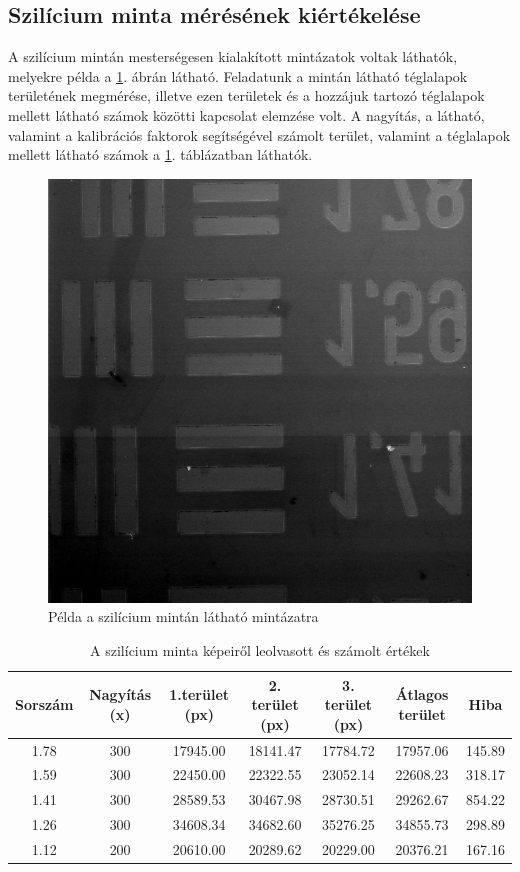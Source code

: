 \documentclass[12pt,a4paper]{article}
\begin{document}
\subsection{Szilícium minta mérésének kiértékelése}
\hspace*{10pt} A szilícium mintán mesterségesen kialakított mintázatok voltak láthatók, melyekre példa a \ref{fig:szil_pel}. ábrán látható. Feladatunk a mintán látható téglalapok területének megmérése, illetve ezen területek és a hozzájuk tartozó téglalapok mellett látható számok közötti kapcsolat elemzése volt. A nagyítás, a látható, valamint a kalibrációs faktorok segítségével számolt terület, valamint a téglalapok mellett látható számok a \ref{tab:szil}. táblázatban láthatók.
\newpage
\begin{figure}[!h]
\centering
\includegraphics[width=0.6\linewidth]{E/E/002_s}
\caption{Példa a szilícium mintán látható mintázatra}
\label{fig:szil_pel}
\end{figure}

\begin{table}[!h]
\begin{center}
\hspace*{-1.5cm}
\begin{tabular}{|c|c|c|c|c|c|c|}
\hline
Sorszám & Nagyítás (x) & 1.terület (px) & 2. terület (px) & 3. terület (px) & Átlagos terület & Hiba\\
\hline
1.78 & 300 & 17945.00 & 18141.47 & 17784.72 &  17957.06 & 145.89\\
\hline
1.59 & 300 & 22450.00 & 22322.55 & 23052.14 & 22608.23 & 318.17\\
\hline
1.41 & 300 & 28589.53 & 30467.98 & 28730.51 & 29262.67 & 854.22\\
\hline
1.26 & 300 & 34608.34 & 34682.60 & 35276.25 & 34855.73 & 298.89\\
\hline
1.12 & 200 & 20610.00 & 20289.62 & 20229.00 & 20376.21 & 167.16\\
\hline
\end{tabular}
\caption{A szilícium minta képeiről leolvasott és számolt értékek}
\label{tab:szil}
\end{center}
\end{table}
\end{document}
